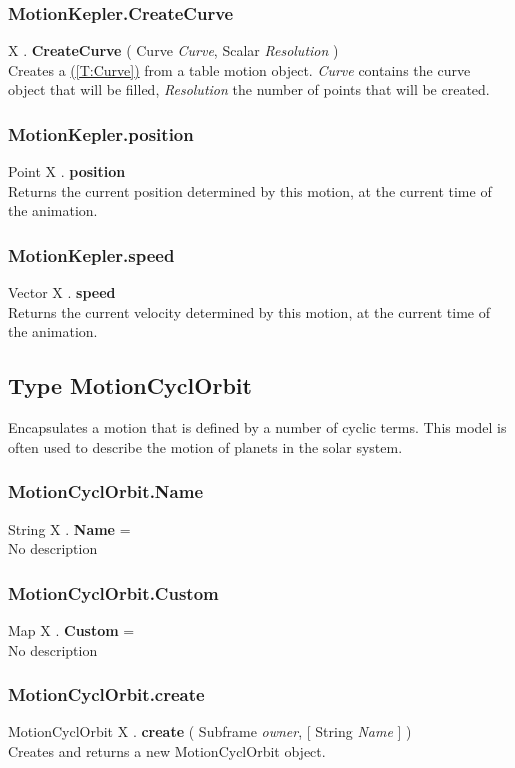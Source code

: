 \documentclass[10pt]{book}
\newcommand{\linkitem}[1]{\hyperref[#1]{\nameref{#1} (\ref{#1})}}
\newcommand{\var}[1]{\textit{#1}}
\begin{document}
\subsubsection{MotionKepler.CreateCurve \label{F:MotionKepler:CreateCurve}}
X . \textbf{CreateCurve} ( Curve \textit{Curve}, Scalar \textit{Resolution} ) \\
Creates a \linkitem{T:Curve} from a table motion object. \var{Curve} contains the curve object that will be filled, \var{Resolution} the number of points that will be created.


\subsubsection{MotionKepler.position \label{F:MotionKepler:position}}
Point X . \textbf{position} \\
Returns the current position determined by this motion, at the current time of the animation.


\subsubsection{MotionKepler.speed \label{F:MotionKepler:speed}}
Vector X . \textbf{speed} \\
Returns the current velocity determined by this motion, at the current time of the animation.

\subsection{Type MotionCyclOrbit \label{T:MotionCyclOrbit}}
Encapsulates a motion that is defined by a number of cyclic terms. This model is often used to describe the motion of planets in the solar system.

\subsubsection{MotionCyclOrbit.Name \label{F:MotionCyclOrbit:Name}}
String X . \textbf{Name} = \\
No description

\subsubsection{MotionCyclOrbit.Custom \label{F:MotionCyclOrbit:Custom}}
Map X . \textbf{Custom} = \\
No description

\subsubsection{MotionCyclOrbit.create \label{F:MotionCyclOrbit:create}}
MotionCyclOrbit X . \textbf{create} ( Subframe \textit{owner},  [ String \textit{Name} ] ) \\
Creates and returns a new MotionCyclOrbit object.
\end{document}
